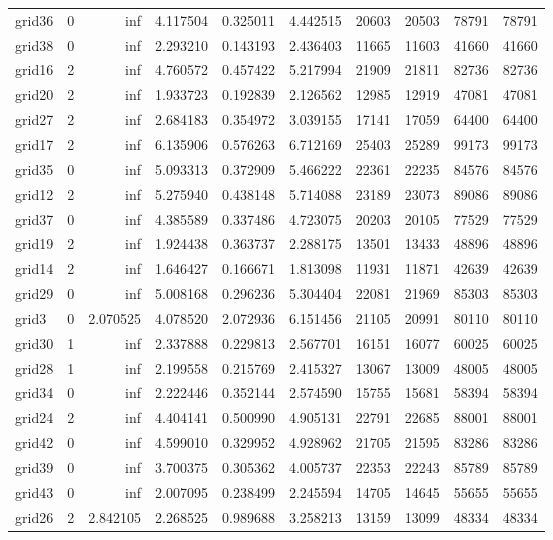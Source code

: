 \begin{longtable}{|l|r|r|r|r|r|r|r|r|r|}
grid36 & 0 & inf & 4.117504 & 0.325011 & 4.442515 & 20603 & 20503 & 78791 & 78791 \\
grid38 & 0 & inf & 2.293210 & 0.143193 & 2.436403 & 11665 & 11603 & 41660 & 41660 \\
grid16 & 2 & inf & 4.760572 & 0.457422 & 5.217994 & 21909 & 21811 & 82736 & 82736 \\
grid20 & 2 & inf & 1.933723 & 0.192839 & 2.126562 & 12985 & 12919 & 47081 & 47081 \\
grid27 & 2 & inf & 2.684183 & 0.354972 & 3.039155 & 17141 & 17059 & 64400 & 64400 \\
grid17 & 2 & inf & 6.135906 & 0.576263 & 6.712169 & 25403 & 25289 & 99173 & 99173 \\
grid35 & 0 & inf & 5.093313 & 0.372909 & 5.466222 & 22361 & 22235 & 84576 & 84576 \\
grid12 & 2 & inf & 5.275940 & 0.438148 & 5.714088 & 23189 & 23073 & 89086 & 89086 \\
grid37 & 0 & inf & 4.385589 & 0.337486 & 4.723075 & 20203 & 20105 & 77529 & 77529 \\
grid19 & 2 & inf & 1.924438 & 0.363737 & 2.288175 & 13501 & 13433 & 48896 & 48896 \\
grid14 & 2 & inf & 1.646427 & 0.166671 & 1.813098 & 11931 & 11871 & 42639 & 42639 \\
grid29 & 0 & inf & 5.008168 & 0.296236 & 5.304404 & 22081 & 21969 & 85303 & 85303 \\
grid3 & 0 & 2.070525 & 4.078520 & 2.072936 & 6.151456 & 21105 & 20991 & 80110 & 80110 \\
grid30 & 1 & inf & 2.337888 & 0.229813 & 2.567701 & 16151 & 16077 & 60025 & 60025 \\
grid28 & 1 & inf & 2.199558 & 0.215769 & 2.415327 & 13067 & 13009 & 48005 & 48005 \\
grid34 & 0 & inf & 2.222446 & 0.352144 & 2.574590 & 15755 & 15681 & 58394 & 58394 \\
grid24 & 2 & inf & 4.404141 & 0.500990 & 4.905131 & 22791 & 22685 & 88001 & 88001 \\
grid42 & 0 & inf & 4.599010 & 0.329952 & 4.928962 & 21705 & 21595 & 83286 & 83286 \\
grid39 & 0 & inf & 3.700375 & 0.305362 & 4.005737 & 22353 & 22243 & 85789 & 85789 \\
grid43 & 0 & inf & 2.007095 & 0.238499 & 2.245594 & 14705 & 14645 & 55655 & 55655 \\
grid26 & 2 & 2.842105 & 2.268525 & 0.989688 & 3.258213 & 13159 & 13099 & 48334 & 48334 \\

\end{longtable}
